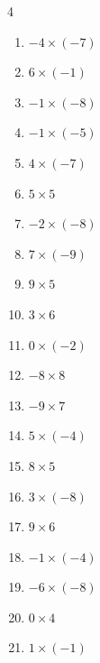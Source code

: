 \begin{multicols}{4}
\begin{enumerate}
  \item $-4\times (-7)$
        \phantom{$=28$}

  \item $6\times (-1)$
        \phantom{$=-6$}

  \item $-1\times (-8)$
        \phantom{$=8$}

  \item $-1\times (-5)$
        \phantom{$=5$}

  \item $4\times (-7)$
        \phantom{$=-28$}

  \item $5\times 5$
        \phantom{$=25$}

  \item $-2\times (-8)$
        \phantom{$=16$}

  \item $7\times (-9)$
        \phantom{$=-63$}

  \item $9\times 5$
        \phantom{$=45$}

  \item $3\times 6$
        \phantom{$=18$}

  \item $0\times (-2)$
        \phantom{$=0$}

  \item $-8\times 8$
        \phantom{$=-64$}

  \item $-9\times 7$
        \phantom{$=-63$}

  \item $5\times (-4)$
        \phantom{$=-20$}

  \item $8\times 5$
        \phantom{$=40$}

  \item $3\times (-8)$
        \phantom{$=-24$}

  \item $9\times 6$
        \phantom{$=54$}

  \item $-1\times (-4)$
        \phantom{$=4$}

  \item $-6\times (-8)$
        \phantom{$=48$}

  \item $0\times 4$
        \phantom{$=0$}

  \item $1\times (-1)$
        \phantom{$=-1$}


\end{enumerate}
\end{multicols}
